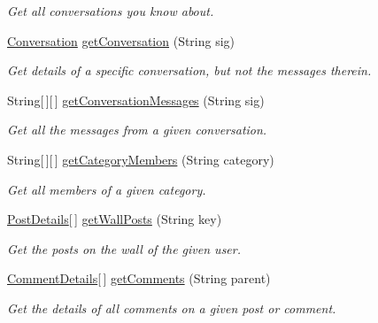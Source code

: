 \begin{DoxyCompactItemize}
\begin{DoxyCompactList}\small\item\em Get all conversations you know about. \end{DoxyCompactList}\item 
\hyperlink{classballmerpeak_1_1turtlenet_1_1shared_1_1Conversation}{Conversation} \hyperlink{classballmerpeak_1_1turtlenet_1_1server_1_1TurtlenetImpl_a70dcea522454279983e72b0fd5c3e9a6}{get\-Conversation} (String sig)
\begin{DoxyCompactList}\small\item\em Get details of a specific conversation, but not the messages therein. \end{DoxyCompactList}\item 
String\mbox{[}$\,$\mbox{]}\mbox{[}$\,$\mbox{]} \hyperlink{classballmerpeak_1_1turtlenet_1_1server_1_1TurtlenetImpl_ac92b6c500d8f9f2b0457e99005bf7674}{get\-Conversation\-Messages} (String sig)
\begin{DoxyCompactList}\small\item\em Get all the messages from a given conversation. \end{DoxyCompactList}\item 
String\mbox{[}$\,$\mbox{]}\mbox{[}$\,$\mbox{]} \hyperlink{classballmerpeak_1_1turtlenet_1_1server_1_1TurtlenetImpl_a4ec6b30f0a39631b060273ce493e3a22}{get\-Category\-Members} (String category)
\begin{DoxyCompactList}\small\item\em Get all members of a given category. \end{DoxyCompactList}\item 
\hyperlink{classballmerpeak_1_1turtlenet_1_1shared_1_1PostDetails}{Post\-Details}\mbox{[}$\,$\mbox{]} \hyperlink{classballmerpeak_1_1turtlenet_1_1server_1_1TurtlenetImpl_a25cd6a95e1664bd10cac1ecad0c985df}{get\-Wall\-Posts} (String key)
\begin{DoxyCompactList}\small\item\em Get the posts on the wall of the given user. \end{DoxyCompactList}\item 
\hyperlink{classballmerpeak_1_1turtlenet_1_1shared_1_1CommentDetails}{Comment\-Details}\mbox{[}$\,$\mbox{]} \hyperlink{classballmerpeak_1_1turtlenet_1_1server_1_1TurtlenetImpl_a8ce303e4ed5dd6b459c28595c4fe53a4}{get\-Comments} (String parent)
\begin{DoxyCompactList}\small\item\em Get the details of all comments on a given post or comment. \end{DoxyCompactList}\item 

\end{DoxyCompactItemize}
